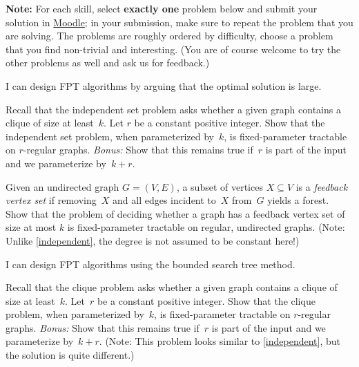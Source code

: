 \documentclass{uebung_cs}
\begin{document}
\textbf{Note:} For each skill, select \textbf{exactly one} problem below and submit your solution in \href{https://moodle.studiumdigitale.uni-frankfurt.de/moodle/course/view.php?id=6259}{Moodle}; in your submission, make sure to repeat the problem that you are solving.
The problems are roughly ordered by difficulty, choose a problem that you find non-trivial and interesting. (You are of course welcome to try the other problems as well and ask us for feedback.)


\begin{skill}
  I can design FPT algorithms by arguing that the optimal solution is large.
\end{skill}

\begin{exercise}\label{independent}
  Recall that the independent set problem asks whether a given graph contains a clique of size at least~$k$.
  Let $r$ be a constant positive integer.
  Show that the independent set problem, when parameterized by~$k$, is fixed-parameter tractable on $r$-regular graphs.
  \emph{Bonus:} Show that this remains true if~$r$ is part of the input and we parameterize by~$k+r$.
\end{exercise}

\begin{exercise}
  Given an undirected graph $G = (V, E)$, a subset of vertices $X \subseteq V$ is a \emph{feedback vertex
  set} if removing~$X$ and all edges incident to~$X$ from~$G$ yields a forest. Show that the problem of deciding
  whether a graph has a feedback vertex set of size at most $k$ is fixed-parameter tractable on regular,
  undirected graphs. (Note: Unlike \ref{independent}, the degree is not assumed to be constant here!)
\end{exercise}


\begin{skill}
  I can design FPT algorithms using the bounded search tree method.
\end{skill}

  \begin{exercise}\label{clique}
    Recall that the clique problem asks whether a given graph contains a clique of size at least~$k$.
    Let~$r$ be a constant positive integer.
    Show that the clique problem, when parameterized by~$k$, is fixed-parameter tractable on $r$-regular graphs.
    \emph{Bonus:} Show that this remains true if~$r$ is part of the input and we parameterize by~$k+r$. (Note: This problem looks similar to \ref{independent}, but the solution is quite different.)
  \end{exercise}
\end{document}
